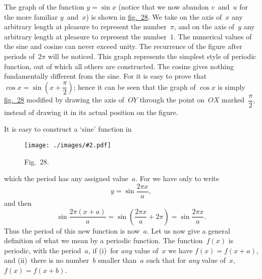 \documentclass[12pt,leqno]{book}[2005/09/16]
\newcommand{\Graphic}[2]{%
  \phantomsection\label{fig:#2}%
  \texttt{[image: ./images/\#2.pdf]}%
}
\newcommand{\DefWidth}{4in}%
\newcommand{\Figure}[2][\DefWidth]{%
  \begin{figure}[hbt!]
    \centering
    \phantomsection\label{fig:#2}
    \Graphic{#1}{fig#2}
    \caption{Fig.~#2.}
  \end{figure}\ignorespaces%
}
\newcommand{\Fig}[2][Fig.]{\hyperref[fig:#2]{#1~#2}}
\newcommand{\PageSep}[1]{\ignorespaces}
\begin{document}
The graph of the function $y = \sin x$ (notice
that we now abandon $v$~and~$u$ for the more
familiar $y$~and~$x$) is shown in \Fig[fig.]{28}. We take
on the axis of~$x$ any arbitrary length at pleasure
to represent the number~$\pi$, and on the axis
of~$y$ any arbitrary length at pleasure to represent
the number~$1$. The numerical values of
the sine and cosine can never exceed unity.
The recurrence of the figure after periods of~$2\pi$
will be noticed. This graph represents the
simplest style of periodic function, out of
which all others are constructed. The cosine
gives nothing fundamentally different from the
sine. For it is easy to prove that $\cos x = \sin(x + \dfrac{\pi}{2})$;
hence it can be seen that the
graph of $\cos x$ is simply \Fig[fig.]{28} modified by
\PageSep{190}
drawing the axis of~$OY$ through the point
on~$OX$ marked~$\dfrac{\pi}{2}$, instead of drawing it in
its actual position on the figure.

It is easy to construct a `sine' function in
\Figure{28}
which the period has any assigned value~$a$.
For we have only to write
\[
y = \sin \frac{2\pi x}{a},
\]
and then
\[
\sin \frac{2\pi (x + a)}{a}
  = \sin \left(\frac{2\pi x}{a} + 2\pi\right)
  = \sin \frac{2\pi x}{a}.
\]
Thus the period of this new function is now~$a$.
Let us now give a general definition of what
\PageSep{191}
we mean by a periodic function. The function~$f(x)$
is periodic, with the period~$a$, if (i)~for \emph{any}
value of~$x$ we have $f(x) = f(x + a)$, and (ii)~there
is no number~$b$ smaller than~$a$ such that for
\emph{any} value of~$x$, $f(x) = f(x + b)$.
\end{document}
